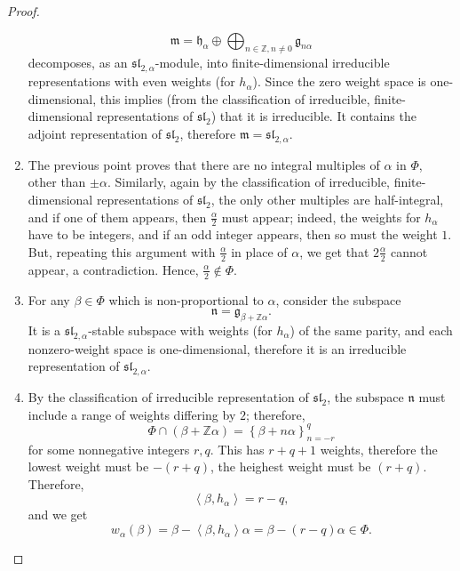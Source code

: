 \begin{proof}
\begin{enumerate}
 $$ \mathfrak m = \mathfrak h_\alpha \oplus \bigoplus_{n\in \mathbb Z, n \ne 0} \mathfrak g_{n\alpha}$$ decomposes, as an $\mathfrak{sl}_{2,\alpha}$-module, into finite-dimensional irreducible representations with even weights (for $h_\alpha$). Since the zero weight space is one-dimensional, this implies (from the classification of irreducible, finite-dimensional representations of $\mathfrak{sl}_2$) that it is irreducible. It contains the adjoint representation of $\mathfrak{sl}_2$, therefore $\mathfrak m = \mathfrak{sl}_{2,\alpha}$. 
 \item The previous point proves that there are no integral multiples of $\alpha$ in $\Phi$, other than $\pm \alpha$. Similarly, again by the classification of irreducible, finite-dimensional representations of $\mathfrak{sl}_2$, the only other multiples are half-integral, and if one of them appears, then $\frac{\alpha}{2}$ must appear; indeed, the weights for $h_\alpha$ have to be integers, and if an odd integer appears, then so must the weight $1$. But, repeating this argument with $\frac{\alpha}{2}$ in place of $\alpha$, we get that $2\frac{\alpha}{2}$ cannot appear, a contradiction. Hence, $\frac{\alpha}{2}\notin \Phi$.
 \item  For any $\beta\in \Phi$ which is non-proportional to $\alpha$, consider the subspace
 $$\mathfrak n = \mathfrak g_{\beta + \mathbb Z \alpha}.$$
 It is a $\mathfrak{sl}_{2,\alpha}$-stable subspace with weights (for $h_\alpha$) of the same parity, and each nonzero-weight space is one-dimensional, therefore it is an irreducible representation of $\mathfrak{sl}_{2,\alpha}$.
 \item By the classification of irreducible representation of $\mathfrak{sl}_2$, the subspace $\mathfrak n$
 must include a range of weights differing by $2$; therefore, 
 $$\Phi \cap (\beta + \mathbb Z \alpha) = \left\{\beta+ n\alpha\right\}_{n=-r}^q$$
 for some nonnegative integers $r, q$. This has $r+q+1$ weights, therefore the lowest weight must be $-(r+q)$, the heighest weight must be $(r+q)$. Therefore, 
\begin{equation}
 \label{equation-pairing-roots}
\left< \beta, h_\alpha\right> = r-q,
\end{equation}
and we get 
 $$ w_\alpha(\beta) = \beta - \left< \beta, h_\alpha\right> \alpha = \beta - (r-q)\alpha \in \Phi.$$
\end{enumerate}
\end{proof}



